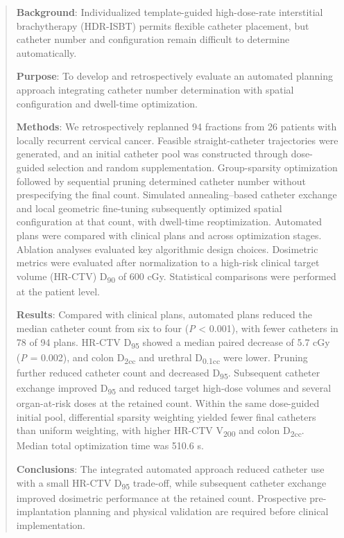 \documentclass[12pt,twoside,letterpaper]{article}
\newcounter{algorithm}
\begin{document}
\begin{abstract}

\noindent \textbf{Background}: Individualized template-guided high-dose-rate interstitial brachytherapy (HDR-ISBT) permits flexible catheter placement, but catheter number and configuration remain difficult to determine automatically.\par

\noindent \textbf{Purpose}: To develop and retrospectively evaluate an automated planning approach integrating catheter number determination with spatial configuration and dwell-time optimization.\par

\noindent \textbf{Methods}: We retrospectively replanned 94 fractions from 26 patients with locally recurrent cervical cancer. Feasible straight-catheter trajectories were generated, and an initial catheter pool was constructed through dose-guided selection and random supplementation. Group-sparsity optimization followed by sequential pruning determined catheter number without prespecifying the final count. Simulated annealing--based catheter exchange and local geometric fine-tuning subsequently optimized spatial configuration at that count, with dwell-time reoptimization. Automated plans were compared with clinical plans and across optimization stages. Ablation analyses evaluated key algorithmic design choices. Dosimetric metrics were evaluated after normalization to a high-risk clinical target volume (HR-CTV) D\textsubscript{90} of 600 cGy. Statistical comparisons were performed at the patient level.\par

\noindent \textbf{Results}: Compared with clinical plans, automated plans reduced the median catheter count from six to four (\emph{P} < 0.001), with fewer catheters in 78 of 94 plans. HR-CTV D\textsubscript{95} showed a median paired decrease of 5.7 cGy (\emph{P} = 0.002), and colon D\textsubscript{2cc} and urethral D\textsubscript{0.1cc} were lower. Pruning further reduced catheter count and decreased D\textsubscript{95}. Subsequent catheter exchange improved D\textsubscript{95} and reduced target high-dose volumes and several organ-at-risk doses at the retained count. Within the same dose-guided initial pool, differential sparsity weighting yielded fewer final catheters than uniform weighting, with higher HR-CTV V\textsubscript{200} and colon D\textsubscript{2cc}. Median total optimization time was 510.6 s.\par

\noindent \textbf{Conclusions}: The integrated automated approach reduced catheter use with a small HR-CTV D\textsubscript{95} trade-off, while subsequent catheter exchange improved dosimetric performance at the retained count. Prospective pre-implantation planning and physical validation are required before clinical implementation.\par

\end{abstract}
\end{document}
